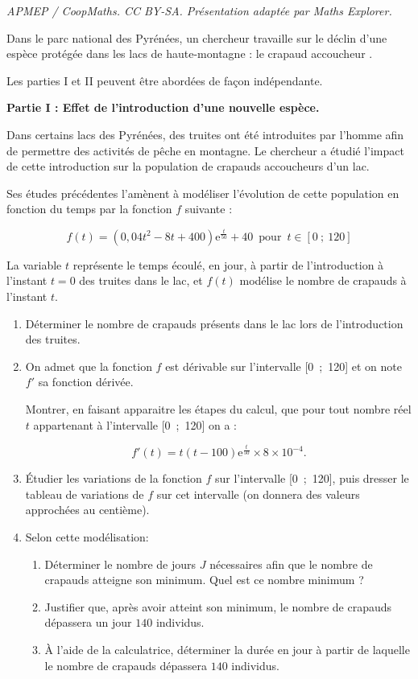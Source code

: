 \documentclass[10pt]{article}
\begin{document}
\noindent\textit{APMEP / CoopMaths. CC BY-SA. Présentation adaptée par Maths Explorer.}\par\medskip
\medskip

Dans le parc national des Pyrénées, un chercheur travaille sur le déclin d'une espèce protégée dans les lacs de haute-montagne : le \og crapaud accoucheur \fg.

Les parties I et II peuvent être abordées de façon indépendante.

\begin{center}\textbf{Partie I : Effet de l'introduction d'une nouvelle espèce.}\end{center}

Dans certains lacs des Pyrénées, des truites ont été introduites par l'homme afin de permettre des activités de pêche en montagne. Le chercheur a étudié l'impact de cette introduction sur la
population de crapauds accoucheurs d'un lac.

Ses études précédentes l'amènent à modéliser l'évolution de cette population en fonction du temps par la fonction $f$ suivante : 

\[f(t) = \left(0,04t^2 - 8t + 400\right)\text{e}^{\frac{t}{50}} + 40 \, \text{ pour }\,  t \in [0~;~120]\]

La variable $t$ représente le temps écoulé, en jour, à partir de l'introduction à l'instant $t = 0$ des truites dans le lac, et $f(t)$ modélise le nombre de crapauds à l'instant $t$.

\medskip

\begin{enumerate}
\item Déterminer le nombre de crapauds présents dans le lac lors de l'introduction des truites.
\item On admet que la fonction $f$ est dérivable sur l'intervalle [0~;~120] et on note $f'$ sa fonction dérivée.

Montrer, en faisant apparaitre les étapes du calcul, que pour tout nombre réel $t$ appartenant à 
l'intervalle [0~;~120] on a : 

\[f'(t) = t(t - 100)\text{e}^{\frac{t}{50}} \times 8 \times 10^{-4}.\]

\item Étudier les variations de la fonction $f$ sur l'intervalle [0~;~120], puis dresser le tableau de variations de $f$ sur cet intervalle (on donnera des valeurs approchées au centième).
\item Selon cette modélisation:
	\begin{enumerate}
		\item Déterminer le nombre de jours $J$ nécessaires afin que le nombre de crapauds atteigne son minimum. Quel est ce nombre minimum ?
		\item Justifier que, après avoir atteint son minimum, le nombre de crapauds dépassera un jour $140$ individus.
		\item À l'aide de la calculatrice, déterminer la durée en jour à partir de laquelle le nombre de crapauds dépassera $140$ individus.
	\end{enumerate}
\end{enumerate}
\end{document}

